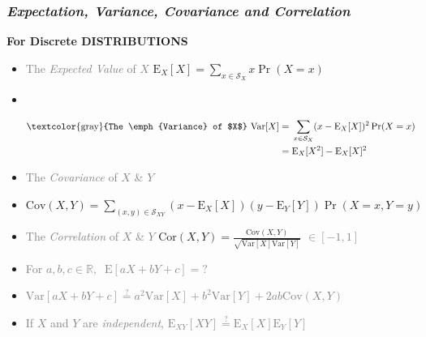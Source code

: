 \documentclass[xcolor={dvipsnames}]{beamer}
\begin{document}
\frame
{
 \frametitle{\emph{Expectation, Variance, Covariance and Correlation}}

\vspace{.75em}

\LARGE
\textbf{For Discrete DISTRIBUTIONS}
\small

\begin{itemize}
\item \textcolor{gray}{The \emph{Expected Value} of $X$} $\displaystyle \text{E}_X[X] = \sum_{x \in \mathcal{S}_{X}} x\Pr(X=x)$

\vspace{.5em}
\item<2->  ${}$

\vspace{-3.5em}
\begin{align*}  
\text{\textcolor{gray}{The \emph{Variance} of $X$} Var}[X] = {} & \sum_{x \in \mathcal{S}_{X}} (x-\text{E}_X[X])^2 \Pr(X=x) \quad\quad \\
= {} & \text{E}_X[X^2] - \text{E}_X[X]^2 
\end{align*}

\vspace{-1em}
\item<3-> \textcolor{gray}{The \emph{Covariance} of $X$ \& $Y$} 
\item<3->[] $\displaystyle  \text{Cov}(X,Y) = \sum_{(x,y) \in \mathcal{S}_{XY}} (x-\text{E}_X[X])(y-\text{E}_Y[Y]) \Pr(X=x,Y=y)$

\item<4-> \textcolor{gray}{The \emph{Correlation} of $X$ \& $Y$ } $\text{Cor}(X,Y) = \frac{\text{Cov}(X,Y)}{\sqrt{\text{Var}[X]\text{Var}[Y] }}$ \footnotesize \textcolor{gray}{$\in [-1, 1]$} \normalsize
\item<5-> \textcolor{gray}{For $a, b, c \in \mathbb{R}, \;\; \text{E}[aX+bY+c] = \text{?}$}
\item<6-> \textcolor{gray}{$\text{Var}[aX+bY+ c] \overset{?}{=} a^2\text{Var}[X] + b^2\text{Var}[Y] + 2ab \text{Cov}(X,Y)$}   
\item<7-> \textcolor{gray}{If $X$ and $Y$ are \emph{independent},  $\text{E}_{XY}[XY] \overset{?}{=} \text{E}_X[X]\text{E}_Y[Y]$}
\end{itemize}

}
\end{document}
